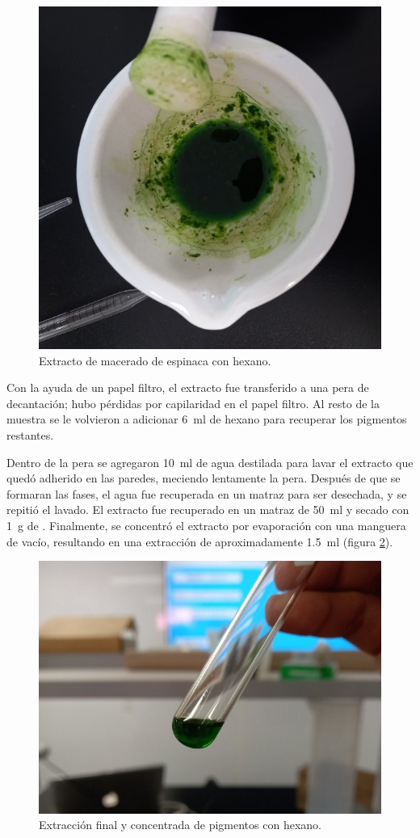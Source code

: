 \documentclass{ITESO-Project}
\begin{document}
\begin{figure}[htpb]
    \centering
    \includegraphics[width=0.5\columnwidth]{figuras/extract.jpg}
    \caption{Extracto de macerado de espinaca con hexano.}
    \label{fig:extract}
\end{figure}

Con la ayuda de un papel filtro, el extracto fue transferido a una pera de decantación; hubo pérdidas por capilaridad en el papel filtro. Al resto de la muestra se le volvieron a adicionar \qty{6}{\ml} de hexano para recuperar los pigmentos restantes.

Dentro de la pera se agregaron \qty{10}{\ml} de agua destilada para lavar el extracto que quedó adherido en las paredes, meciendo lentamente la pera. Después de que se formaran las fases, el agua fue recuperada en un matraz para ser desechada, y se repitió el lavado. El extracto fue recuperado en un matraz de \qty{50}{\ml} y secado con \qty{1}{\g} de . Finalmente, se concentró el extracto por evaporación con una manguera de vacío, resultando en una extracción de aproximadamente \qty{1.5}{\ml} (figura \ref{fig:final-extract}).

\begin{figure}[htpb]
    \centering
    \includegraphics[width=0.5\columnwidth]{figuras/final_extract.jpg}
    \caption{Extracción final y concentrada de pigmentos con hexano.}
    \label{fig:final-extract}
\end{figure}
\end{document}

